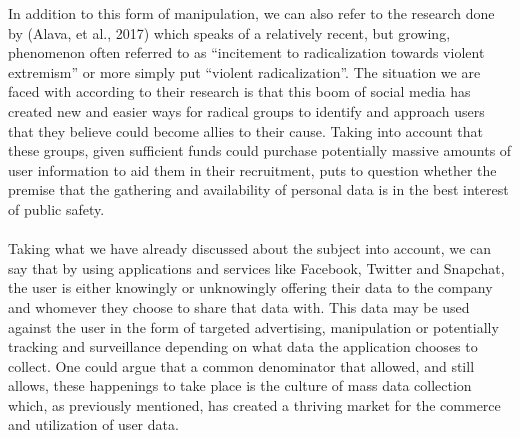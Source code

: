 \documentclass[11pt]{article}
\begin{document}
 

In addition to this form of manipulation, we can also refer to the research done by (Alava, et al., 2017) which speaks of a relatively recent, but growing, phenomenon often referred to as “incitement to radicalization towards violent extremism” or more simply put “violent radicalization”. The situation we are faced with according to their research is that this boom of social media has created new and easier ways for radical groups to identify and approach users that they believe could become allies to their cause. Taking into account that these groups, given sufficient funds could purchase potentially massive amounts of user information to aid them in their recruitment, puts to question whether the premise that the gathering and availability of personal data is in the best interest of public safety. \\ \\

 

Taking what we have already discussed about the subject into account, we can say that by using applications and services like Facebook, Twitter and Snapchat, the user is either knowingly or unknowingly offering their data to the company and whomever they choose to share that data with. This data may be used against the user in the form of targeted advertising, manipulation or potentially tracking and surveillance depending on what data the application chooses to collect. One could argue that a common denominator that allowed, and still allows, these happenings to take place is the culture of mass data collection which, as previously mentioned, has created a thriving market for the commerce and utilization of user data.  \\ \\
\end{document}

